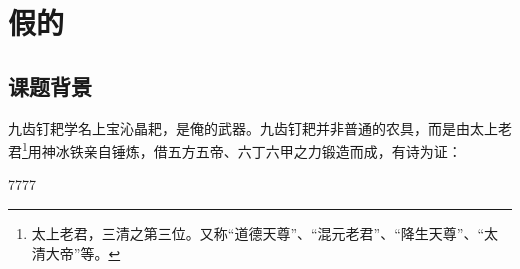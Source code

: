 \chapter{假的}

\section{课题背景}

九齿钉耙学名{\kaishu 上宝沁晶耙}，是俺的武器。九齿钉耙并非普通的农具，而是由太上老君\footnote{太上老君，三清之第三位。又称“道德天尊”、“混元老君”、“降生天尊”、“太清大帝”等。}用神冰铁亲自锤炼，借五方五帝、六丁六甲之力锻造而成，有诗为证：

7777

